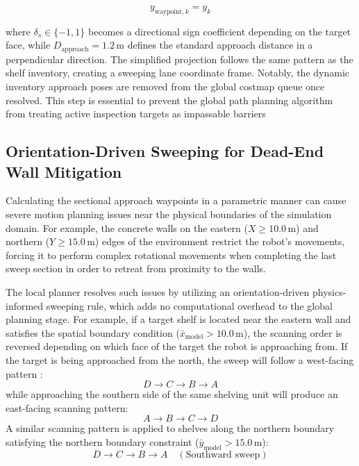 \begin{equation} 
    y_{\text{waypoint}, k} = y_k \label{eq:cluster_y_offset} 
\end{equation}

where $\delta_s \in \{-1, 1\}$ becomes a directional sign coefficient depending on the target face, while $D_{\text{approach}} = 1.2\,\text{m}$ defines the standard approach distance in a perpendicular direction. The simplified projection follows the same pattern as the shelf inventory, creating a sweeping lane coordinate frame. Notably, the dynamic inventory approach poses are removed from the global costmap queue once resolved. This step is essential to prevent the global path planning algorithm from treating active inspection targets as impassable barriers

\subsection{Orientation-Driven Sweeping for Dead-End Wall Mitigation}\label{sec:ch5_deadend_sweep}

Calculating the sectional approach waypoints in a parametric manner can cause severe motion planning issues near the physical boundaries of the simulation domain. For example, the concrete walls on the eastern ($X \ge 10.0\,\text{m}$) and northern ($Y \ge 15.0\,\text{m}$) edges of the environment restrict the robot's movements, forcing it to perform complex rotational movements when completing the last sweep section in order to retreat from proximity to the walls.

The local planner resolves such issues by utilizing an orientation-driven physics-informed sweeping rule, which adds no computational overhead to the global planning stage. For example, if a target shelf is located near the eastern wall and satisfies the spatial boundary condition ($\bar{x}_{\text{model}} > 10.0\,\text{m}$), the scanning order is reversed depending on which face of the target the robot is approaching from. If the target is being approached from the north, the sweep will follow a west-facing pattern \cite{lafmejani2021nonlinear, chandra2025deadlock}:
\begin{equation}
D \rightarrow C \rightarrow B \rightarrow A
\end{equation}
while approaching the southern side of the same shelving unit will produce an east-facing scanning pattern:
\begin{equation}
A \rightarrow B \rightarrow C \rightarrow D
\end{equation}
A similar scanning pattern is applied to shelves along the northern boundary satisfying the northern boundary constraint ($\bar{y}_{\text{model}} > 15.0\,\text{m}$):
\begin{equation}
D \rightarrow C \rightarrow B \rightarrow A \quad (\text{Southward sweep})
\end{equation}

